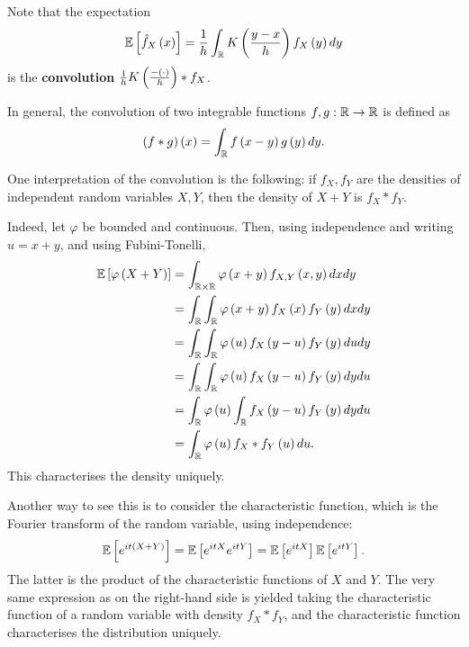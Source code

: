 \begin{remark}
Note that the expectation
  \begin{equation*}
  \mathbb{E}\left[\hat{f}_X\left(x\right)\right] = \frac{1}{h}\int_{\mathbb{R}} K\left(\frac{y-x}{h}\right) f_X\left(y\right)dy
  \end{equation*}
  is the \textbf{convolution} $\frac{1}{h} K\left(\frac{- \left(\cdot\right)}{h}\right)\ast f_X$.

  In general, the convolution of two integrable functions $f,g:\mathbb{R}\rightarrow \mathbb{R}$ is defined as
  \begin{equation*}
  \left(f\ast g\right)\left(x\right) = \int_{\mathbb{R}} f\left(x-y\right) g\left(y\right) dy.
    \end{equation*}

  One interpretation of the convolution is the following: if $f_X,f_Y$ are the densities of independent random variables $X,Y$, then the density of $X+Y$ is $f_X\ast f_Y$.

  Indeed, let $\varphi$ be bounded and continuous. Then, using independence and writing $u=x+y$, and using Fubini-Tonelli,
  \begin{equation*}
  \begin{split}
    \mathbb{E}\left[\varphi\left(X+Y\right)\right]&=\int_{\mathbb{R}\times \mathbb{R}} \varphi \left(x+y\right) f_{X,Y}\left(x,y\right) dx dy \\
    &= \int_{\mathbb{R}} \int_{\mathbb{R}} \varphi\left(x+y\right)f_X\left(x\right)f_Y\left(y\right) dx dy \\
    &= \int_{\mathbb{R}} \int_{\mathbb{R}} \varphi\left(u\right) f_X\left(y-u\right) f_Y\left(y\right) du dy \\
    &= \int_{\mathbb{R}} \int_{\mathbb{R}} \varphi\left(u\right) f_X\left(y-u\right)f_Y\left(y\right) dy du \\
    &=\int_{\mathbb{R}} \varphi\left(u\right)\int_{\mathbb{R}} f_X\left(y-u\right)f_Y\left(y\right) dy du \\
    &=\int_{\mathbb{R}} \varphi\left(u\right) f_X\ast f_Y \left(u\right) du.
    \end{split}
  \end{equation*}
  This characterises the density uniquely.

  Another way to see this is to consider the characteristic function, which is the Fourier transform of the random variable, using independence:
  \begin{equation*}
    \mathbb{E}\left[e^{it\left(X+Y\right)}\right] = \mathbb{E}\left[e^{itX}e^{itY}\right] = \mathbb{E}\left[e^{itX}\right]\mathbb{E}\left[e^{itY}\right].
  \end{equation*}
  The latter is the product of the characteristic functions of $X$ and $Y$. The very same expression as on the right-hand side is yielded taking the characteristic function of a random variable with density $f_X\ast f_Y$, and the characteristic function characterises the distribution uniquely.
\end{remark}
